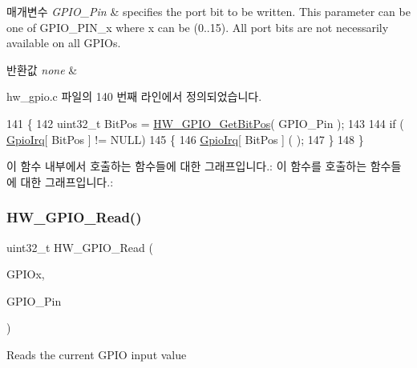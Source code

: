 \begin{DoxyParams}{매개변수}
{\em G\+P\+I\+O\+\_\+\+Pin} & specifies the port bit to be written. This parameter can be one of G\+P\+I\+O\+\_\+\+P\+I\+N\+\_\+x where x can be (0..15). All port bits are not necessarily available on all G\+P\+I\+Os. \\
\hline
\end{DoxyParams}

\begin{DoxyRetVals}{반환값}
{\em none} & \\
\hline
\end{DoxyRetVals}


hw\+\_\+gpio.\+c 파일의 140 번째 라인에서 정의되었습니다.


\begin{DoxyCode}
141 \{
142   uint32\_t BitPos = \mbox{\hyperlink{group___lory_s_d_k___g_p_i_o___functions_ga047b5023e2411e910f43fe0ae7df38a7}{HW\_GPIO\_GetBitPos}}( GPIO\_Pin );
143   
144   \textcolor{keywordflow}{if} ( \mbox{\hyperlink{hw__gpio_8c_a6831d3079d34f8de886dc6349615b17f}{GpioIrq}}[ BitPos ]  != NULL)
145   \{
146     \mbox{\hyperlink{hw__gpio_8c_a6831d3079d34f8de886dc6349615b17f}{GpioIrq}}[ BitPos ] ( );
147   \}
148 \}
\end{DoxyCode}
이 함수 내부에서 호출하는 함수들에 대한 그래프입니다.\+:
이 함수를 호출하는 함수들에 대한 그래프입니다.\+:
\mbox{\label{group___lory_s_d_k___g_p_i_o___functions_ga56b12661dd88a5efa2ea9ee2aed4f82f}} 
\subsubsection{\texorpdfstring{H\+W\+\_\+\+G\+P\+I\+O\+\_\+\+Read()}{HW\_GPIO\_Read()}}
{\footnotesize\ttfamily uint32\+\_\+t H\+W\+\_\+\+G\+P\+I\+O\+\_\+\+Read (\begin{DoxyParamCaption}\item[{G\+P\+I\+O\+\_\+\+Type\+Def $\ast$}]{G\+P\+I\+Ox,  }\item[{uint16\+\_\+t}]{G\+P\+I\+O\+\_\+\+Pin }\end{DoxyParamCaption})}



Reads the current G\+P\+IO input value 



